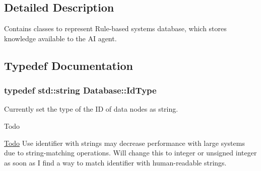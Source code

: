 \subsection{Detailed Description}
Contains classes to represent Rule-\/based system\textquotesingle{}s database, which stores knowledge available to the AI agent. 

\subsection{Typedef Documentation}
\subsubsection[{\texorpdfstring{Id\+Type}{IdType}}]{\setlength{\rightskip}{0pt plus 5cm}typedef std\+::string {\bf Database\+::\+Id\+Type}}\hypertarget{namespaceDatabase_abca840aa37b2fd02e1d82e32a8171437}{}\label{namespaceDatabase_abca840aa37b2fd02e1d82e32a8171437}


Currently set the type of the ID of data nodes as string. 

\begin{DoxyRefDesc}{Todo}
\item[\hyperlink{todo__todo000001}{Todo}]Use identifier with strings may decrease performance with large systems due to string-\/matching operations. Will change this to integer or unsigned integer as soon as I find a way to match identifier with human-\/readable strings. \end{DoxyRefDesc}
